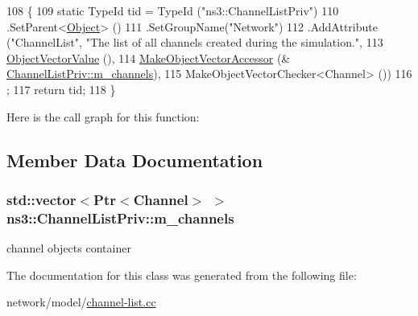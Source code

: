 \begin{DoxyCode}
108 \{
109   \textcolor{keyword}{static} TypeId tid = TypeId (\textcolor{stringliteral}{"ns3::ChannelListPriv"})
110     .SetParent<\hyperlink{classns3_1_1Object_a40860402e64d8008fb42329df7097cdb}{Object}> ()
111     .SetGroupName(\textcolor{stringliteral}{"Network"})
112     .AddAttribute (\textcolor{stringliteral}{"ChannelList"}, \textcolor{stringliteral}{"The list of all channels created during the simulation."},
113                    \hyperlink{namespacens3_a5de726d8bcea7a51fd68ce5167a66713}{ObjectVectorValue} (),
114                    \hyperlink{namespacens3_a6ad5b3621a5dc72b7030cbb07c73adf6}{MakeObjectVectorAccessor} (&
      \hyperlink{classns3_1_1ChannelListPriv_aed5ffcdd3ed2375643282721c57f33b8}{ChannelListPriv::m\_channels}),
115                    MakeObjectVectorChecker<Channel> ())
116   ;
117   \textcolor{keywordflow}{return} tid;
118 \}
\end{DoxyCode}


Here is the call graph for this function\+:




\subsection{Member Data Documentation}
\subsubsection[{\texorpdfstring{m\+\_\+channels}{m_channels}}]{\setlength{\rightskip}{0pt plus 5cm}std\+::vector$<${\bf Ptr}$<${\bf Channel}$>$ $>$ ns3\+::\+Channel\+List\+Priv\+::m\+\_\+channels\hspace{0.3cm}{\ttfamily [private]}}\hypertarget{classns3_1_1ChannelListPriv_aed5ffcdd3ed2375643282721c57f33b8}{}\label{classns3_1_1ChannelListPriv_aed5ffcdd3ed2375643282721c57f33b8}


channel objects container 



The documentation for this class was generated from the following file\+:\begin{DoxyCompactItemize}
\item 
network/model/\hyperlink{channel-list_8cc}{channel-\/list.\+cc}\end{DoxyCompactItemize}
